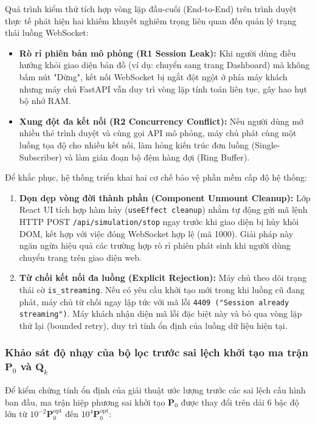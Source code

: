 \hspace{0.5cm} Quá trình kiểm thử tích hợp vòng lặp đầu-cuối (End-to-End) trên trình duyệt thực tế phát hiện hai khiếm khuyết nghiêm trọng liên quan đến quản lý trạng thái luồng WebSocket:
\begin{itemize}
    \item \textbf{Rò rỉ phiên bản mô phỏng (R1 Session Leak):} Khi người dùng điều hướng khỏi giao diện bản đồ (ví dụ: chuyển sang trang Dashboard) mà không bấm nút "Dừng", kết nối WebSocket bị ngắt đột ngột ở phía máy khách nhưng máy chủ FastAPI vẫn duy trì vòng lặp tính toán liên tục, gây hao hụt bộ nhớ RAM.
    \item \textbf{Xung đột đa kết nối (R2 Concurrency Conflict):} Nếu người dùng mở nhiều thẻ trình duyệt và cùng gọi API mô phỏng, máy chủ phát cùng một luồng tọa độ cho nhiều kết nối, làm hỏng kiến trúc đơn luồng (Single-Subscriber) và làm gián đoạn bộ đệm hàng đợi (Ring Buffer).
\end{itemize}

Để khắc phục, hệ thống triển khai hai cơ chế bảo vệ phần mềm cấp độ hệ thống:
\begin{enumerate}
    \item \textbf{Dọn dẹp vòng đời thành phần (Component Unmount Cleanup):} Lớp React UI tích hợp hàm hủy (\texttt{useEffect cleanup}) nhằm tự động gửi mã lệnh HTTP POST \texttt{/api/simulation/stop} ngay trước khi giao diện bị hủy khỏi DOM, kết hợp với việc đóng WebSocket hợp lệ (mã 1000). Giải pháp này ngăn ngừa hiệu quả các trường hợp rò rỉ phiên phát sinh khi người dùng chuyển trang trên giao diện web.
    \item \textbf{Từ chối kết nối đa luồng (Explicit Rejection):} Máy chủ theo dõi trạng thái cờ \texttt{is\_streaming}. Nếu có yêu cầu khởi tạo mới trong khi luồng cũ đang phát, máy chủ từ chối ngay lập tức với mã lỗi \texttt{4409 ("Session already streaming")}. Máy khách nhận diện mã lỗi đặc biệt này và bỏ qua vòng lặp thử lại (bounded retry), duy trì tính ổn định của luồng dữ liệu hiện tại.
\end{enumerate}

\subsubsection{Khảo sát độ nhạy của bộ lọc trước sai lệch khởi tạo ma trận \texorpdfstring{$\mathbf{P}_0$ và $\mathbf{Q}_k$}{P0 và Qk}}

\hspace{0.5cm} Để kiểm chứng tính ổn định của giải thuật ước lượng trước các sai lệch cấu hình ban đầu, ma trận hiệp phương sai khởi tạo $\mathbf{P}_0$ được thay đổi trên dải 6 bậc độ lớn từ $10^{-2} \mathbf{P}_0^{\text{opt}}$ đến $10^4 \mathbf{P}_0^{\text{opt}}$:

